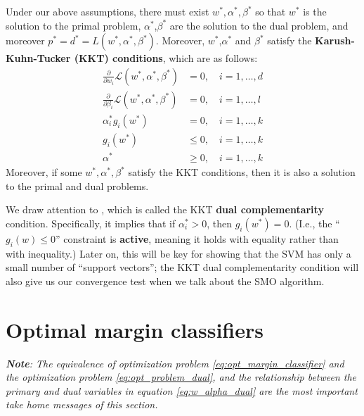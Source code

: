 Under our above assumptions, there must exist $w^* ,\alpha^* ,\beta^*$ so that $w^*$ is the
solution to the primal problem, $\alpha^*$,$\beta^*$ are the solution to the dual problem,
and moreover $p^* = d^* = L(w^* ,\alpha^* ,\beta^*)$. Moreover, $w^*$,$\alpha^*$ and $\beta^*$ satisfy the
\textbf{Karush-Kuhn-Tucker (KKT) conditions}, which are as follows:
\begin{align}
    \frac{\partial}{\partial w_i} \mathcal L(w^* ,\alpha^* ,\beta^* ) &= 0, \quad i = 1,\ldots ,d\label{eq:kkt1}\\
    \frac{\partial}{\partial \beta_i} \mathcal L(w^* ,\alpha^* ,\beta^* ) &= 0, \quad i = 1,\ldots ,l\label{eq:kkt2}\\
    \alpha^*_i g_i (w^*) &= 0, \quad i = 1,\ldots ,k\label{eq:kkt3}\\
    g_i (w^*) &\le 0, \quad i = 1,\ldots ,k\label{eq:kkt4}\\
    \alpha^* &\ge 0, \quad i = 1,\ldots ,k\label{eq:kkt5}
\end{align}
Moreover, if some $w^* ,\alpha^* ,\beta^*$ satisfy the KKT conditions, then it is also a
solution to the primal and dual problems.

We draw attention to , which is called the KKT \textbf{dual
complementarity} condition. Specifically, it implies that if $\alpha^*_i > 0$, then
$g_i (w^*) = 0$. (I.e., the ``$g_i (w) \le 0$'' constraint is \textbf{active}, meaning it holds with
equality rather than with inequality.) Later on, this will be key for showing
that the SVM has only a small number of ``support vectors''; the KKT dual
complementarity condition will also give us our convergence test when we
talk about the SMO algorithm.

\section{Optimal margin classifiers}
\textit{\textbf{Note}: The equivalence of optimization problem \ref{eq:opt_margin_classifier} and the optimization
problem \ref{eq:opt_problem_dual}, and the relationship between the primary and dual variables in
equation \ref{eq:w_alpha_dual} are the most important take home messages of this section.}

